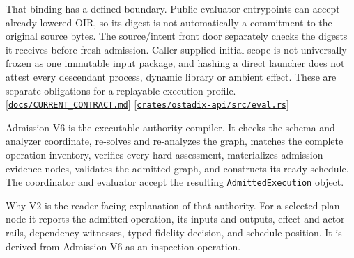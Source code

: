 \documentclass[11pt,oneside]{article}
\newcommand{\src}[1]{\textcolor{OSlate}{\scriptsize[\href{https://github.com/lostadi/OSTADIX/blob/c0b02c326b2329a95ba52447c7180bc93957cd57/#1}{\nolinkurl{#1}}]}\allowbreak}
\begin{document}
That binding has a defined boundary. Public evaluator entrypoints can accept
already-lowered OIR, so its digest is not automatically a commitment to the
original source bytes. The source/intent front door separately checks the
digests it receives before fresh admission. Caller-supplied initial scope is
not universally frozen as one immutable input package, and hashing a direct
launcher does not attest every descendant process, dynamic library or ambient
effect. These are separate obligations for a replayable execution profile.
\src{docs/CURRENT_CONTRACT.md}
\src{crates/ostadix-api/src/eval.rs}

Admission V6 is the executable authority compiler. It checks the schema and
analyzer coordinate, re-solves and re-analyzes the graph, matches the complete
operation inventory, verifies every hard assessment, materializes admission
evidence nodes, validates the admitted graph, and constructs its ready
schedule. The coordinator and evaluator accept the resulting
\texttt{AdmittedExecution} object.

Why V2 is the reader-facing explanation of that authority. For a selected plan
node it reports the admitted operation, its inputs and outputs, effect and
actor rails, dependency witnesses, typed fidelity decision, and schedule
position. It is derived from Admission V6 as an inspection operation.
\end{document}
